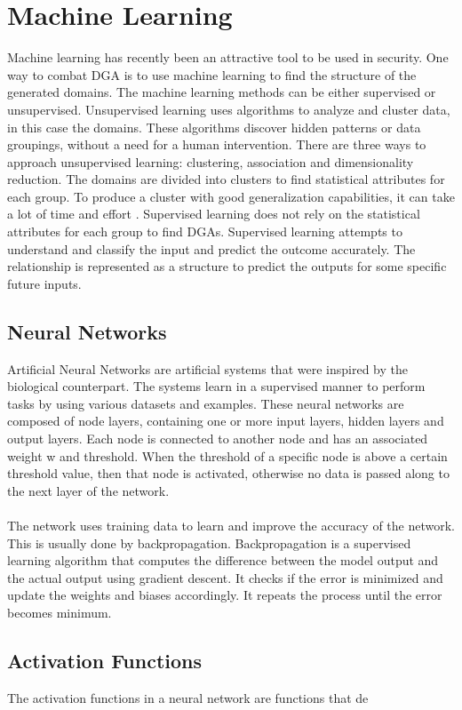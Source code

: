 \section{Machine Learning}
Machine learning has recently been an attractive tool to be used in security. One way to combat DGA is to use machine learning to find the structure of the generated domains. The machine learning methods can be either supervised or unsupervised. Unsupervised learning uses algorithms to analyze and cluster data, in this case the domains. These algorithms discover hidden patterns or data groupings, without a need for a human intervention. There are three ways to approach unsupervised learning: clustering, association and dimensionality reduction. The domains are divided into clusters to find statistical attributes for each group. To produce a cluster with good generalization capabilities, it can take a lot of time and  effort \cite{unsupervised}. Supervised learning does not rely on the statistical attributes  for each group to find DGAs. Supervised learning attempts to understand and classify the input and predict the outcome accurately. The relationship is represented as a structure to predict the outputs for some specific future inputs.  
\subsection{Neural Networks}
Artificial Neural Networks are artificial systems that were inspired by the biological counterpart. The systems learn in a supervised manner to perform tasks by using various datasets and examples. These neural networks are composed of node layers, containing one or more input layers, hidden layers and output layers. Each node is connected to another node and has an associated weight w and threshold. When the threshold of a specific node is above a certain threshold value, then that node is activated, otherwise no data is passed along to the next layer of the network. \\\\ 
The network uses training data to learn and improve the accuracy of the network. This is usually done by backpropagation. Backpropagation is a supervised learning algorithm that computes the difference between the model output and the actual output using gradient descent\cite{gradient_descent}. It checks if the error is minimized and update the weights and biases accordingly. It repeats the process until the error becomes minimum.  

\subsection{Activation Functions}
The activation functions in a neural network are functions that de

